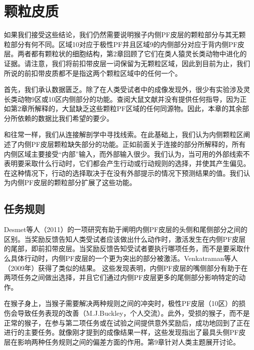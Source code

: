 \section{颗粒皮质}
如果我们接受这些结论，我们仍然需要说明猴子内侧PF皮层的颗粒部分与其无颗粒部分有何不同。区域10对应于极性PF并且区域9的内侧部分对应于背内侧PF皮层。两者都有颗粒状的细胞结构，第2章回顾了它们在类人猿灵长类动物中进化的证据。请注意，我们将前扣带皮层一词保留为无颗粒区域，因此到目前为止，我们所说的前扣带皮质都不是指这两个颗粒区域中的任何一个。\par
首先，我们承认数据匮乏。除了在人类受试者中的成像发现外，很少有实验涉及灵长类动物9区或10区内侧部分的功能。查阅大鼠文献并没有提供任何指导，因为正如第2章所解释的，大鼠缺乏这些颗粒PF区域的任何同源物。因此，本章的其余部分所依赖的数据比我们希望的要少。\par
和往常一样，我们从连接解剖学中寻找线索。在此基础上，我们认为内侧颗粒区阐述了内侧PF皮层颗粒缺失部分的功能。正如前面关于连接的部分所解释的，所有内侧区域主要接受“内部”输入，而外部输入很少。我们认为，当可用的外部线索不表明要采取什么行动时，它们都会产生行动或行动规则的选择，并使其产生偏见。在这种情况下，行动的选择取决于在没有外部提示的情况下预测结果的值。我们认为内侧PF皮层的颗粒部分扩展了这些功能。\par
\subsection{任务规则}
Desmet等人（2011）的一项研究有助于阐明内侧PF皮层的头侧和尾侧部分之间的区别。当奖励反馈告知人类受试者应该做出什么动作时，激活发生在内侧PF皮层的尾部，即前扣带皮层。当奖励反馈告知受试者要执行哪项任务，而不是要采取什么具体行动时，内侧PF皮层的一个更为突出的部分被激活。Venkatraman等人（2009年）获得了类似的结果。
这些发现表明，内侧PF皮层的嘴侧部分有助于在两项任务之间做出选择，并且它们通过内侧PF皮层更多的尾侧部分影响特定的动作。\par
在猴子身上，当猴子需要解决两种规则之间的冲突时，极性PF皮层（10区）的损伤会导致任务表现的改善（M.J.Buckley，个人交流）。此外，受损的猴子，而不是正常的猴子，在参与第二项任务或在试验之间提供意外奖励后，成功地回到了正在进行的主要任务。就像刚才提到的成像结果一样，这些发现指出了最具头侧PF皮层在影响两种任务规则之间的偏差方面的作用。第9章针对人类主题展开讨论。\par
